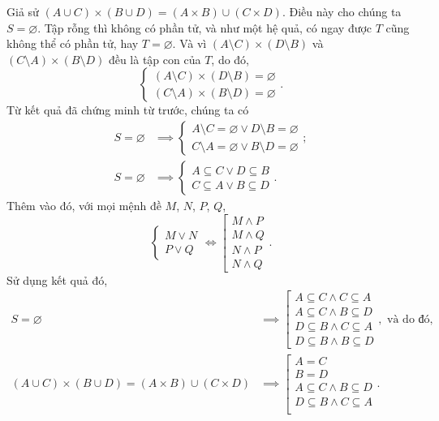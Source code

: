 Giả sử $(A \cup C) \times (B \cup D) = (A \times B) \cup (C \times D)$. Điều này cho chúng ta $S = \varnothing$. Tập rỗng thì không có phần tử, và như một hệ quả, có ngay được $T$ cũng không thể có phần tử, hay $T = \varnothing$. Và vì $(A \setminus C) \times (D \setminus B)$ và $(C \setminus A) \times (B \setminus D)$ đều là tập con của $T$, do đó, 
$$
\begin{cases}
   (A \setminus C) \times (D \setminus B) = \varnothing \\
   (C \setminus A) \times (B \setminus D) = \varnothing
\end{cases}.
$$
Từ kết quả đã chứng minh từ trước, chúng ta có 
\begin{align*}
   S = \varnothing &\implies \begin{cases}
      A \setminus C = \varnothing \lor D \setminus B = \varnothing \\
      C \setminus A = \varnothing \lor B \setminus D = \varnothing
   \end{cases}; \\
   S = \varnothing &\implies \begin{cases}
      A \subseteq C \lor D \subseteq B \\
      C \subseteq A \lor B \subseteq D
   \end{cases}.
\end{align*}
Thêm vào đó, với mọi mệnh đề $M$, $N$, $P$, $Q$, \begin{equation*}
   \begin{cases}
      M \lor N \\
      P \lor Q
   \end{cases} \iff \left[\begin{array}{l}
      M \land P \\
      M \land Q \\
      N \land P \\
      N \land Q
   \end{array}\right..
\end{equation*}
Sử dụng kết quả đó, 
\begin{align*}
   S = \varnothing &\implies \left[\begin{array}{l}
      A \subseteq C \land C \subseteq A \\
      A \subseteq C \land B \subseteq D \\
      D \subseteq B \land C \subseteq A \\
      D \subseteq B \land B \subseteq D
   \end{array}\right., \text{~và do đó,} \\
   (A \cup C) \times (B \cup D) = (A \times B) \cup (C \times D) &\implies \left[\begin{array}{l}
      A = C \\
      B = D \\
      A \subseteq C \land B \subseteq D \\
      D \subseteq B \land C \subseteq A \\
   \end{array}\right..
\end{align*}

